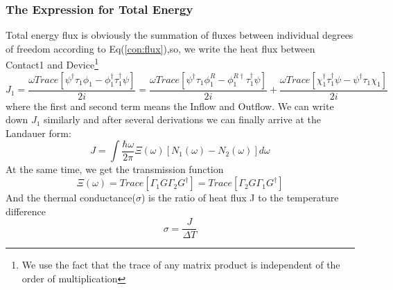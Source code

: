 \subsubsection*{The Expression for Total Energy}
Total energy flux is obviously the summation of fluxes between individual degrees of freedom according to Eq(\ref{con:flux}),so, 
we write the heat flux between Contact1 and Device\footnote{We use the fact that the trace of any matrix product is independent of the order of multiplication}
\begin{equation}
J_1=\frac{\omega Trace [\psi^{\dag}\tau_1\phi_1 - \phi_1^{\dag}\tau_1^{\dag}\psi]}{2 i}=
\frac{\omega Trace [\psi^{\dag}\tau_1\phi_1^R - \phi_1^{R \dag}\tau_1^{\dag}\psi]}{2 i}+
\frac{\omega Trace [\chi_1^{\dag}\tau_1^{\dag}\psi - \psi^{\dag}\tau_1\chi_1]}{2 i}
\end{equation}
where the first and second term means the Inflow and Outflow.
We can write down $J_1$ similarly and after several derivations we can finally arrive at the Landauer form\citep{Buldum}:
\begin{equation}
J=\int \frac{\hbar \omega}{2 \pi}\Xi(\omega)[N_1(\omega)-N_2(\omega)]d\omega
\end{equation}
At the same time, we get the transmission function
\begin{equation}
\Xi(\omega)= Trace[\Gamma_1 G \Gamma_2 G^{\dag}]= Trace[\Gamma_2 G \Gamma_1 G^{\dag}]
\end{equation}
And the thermal conductance($\sigma$) is the ratio of heat flux J to the temperature difference
\begin{equation}
\sigma=\frac{J}{\Delta T}
\end{equation}

